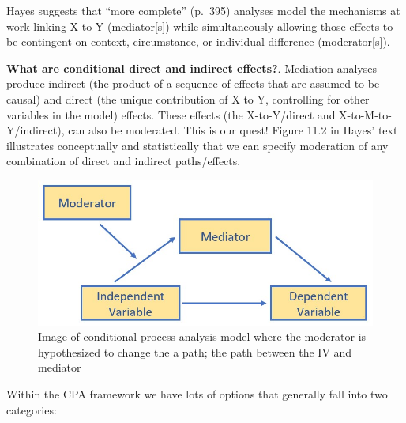 \documentclass[
  11pt,
]{book}
\begin{document}
Hayes \citeyearpar{hayes_introduction_2018} suggests that ``more complete'' (p.~395) analyses model the mechanisms at work linking X to Y (mediator{[}s{]}) while simultaneously allowing those effects to be contingent on context, circumstance, or individual difference (moderator{[}s{]}).

\textbf{What are conditional direct and indirect effects?}. Mediation analyses produce indirect (the product of a sequence of effects that are assumed to be causal) and direct (the unique contribution of X to Y, controlling for other variables in the model) effects. These effects (the X-to-Y/direct and X-to-M-to-Y/indirect), can also be moderated. This is our quest! Figure 11.2 in Hayes' text \citeyearpar{hayes_introduction_2018} illustrates conceptually and statistically that we can specify moderation of any combination of direct and indirect paths/effects.

\begin{figure}
\centering
\includegraphics{images/SimpleMed/CPAmodel.jpg}
\caption{Image of conditional process analysis model where the moderator is hypothesized to change the a path; the path between the IV and mediator}
\end{figure}

Within the CPA framework we have lots of options that generally fall into two categories:
\end{document}
